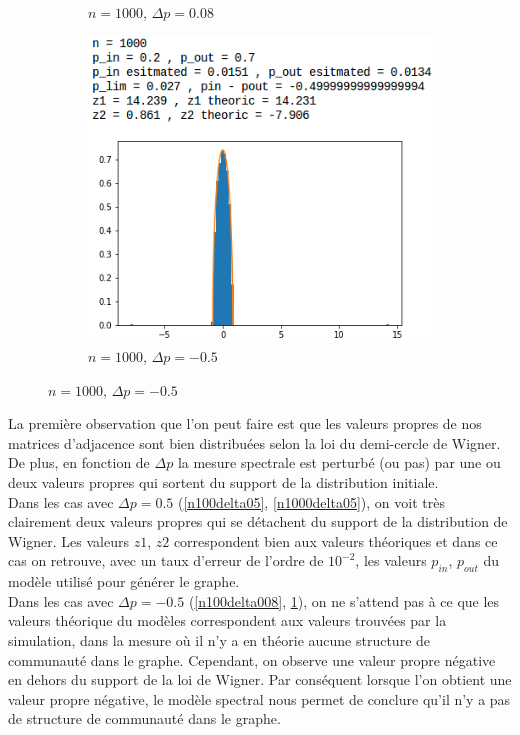 \begin{figure}[H]
\begin{subfigure}{.5\textwidth}
		\caption{$n=1000$, $\Delta p=0.08$}
		\label{n1000delta008}
	\end{subfigure}
	\begin{subfigure}{.5\textwidth}
		\centering
		\includegraphics[scale=0.58]{static/spectral_n1000_pin02_pout07.png}
		\caption{$n=1000$, $\Delta p=-0.5$}
		\label{n1000delta-05}
	\end{subfigure}
\end{figure}

La première observation que l'on peut faire est que les valeurs propres de nos matrices d'adjacence sont bien distribuées selon la loi du demi-cercle de Wigner.
De plus, en fonction de $\Delta p$ la mesure spectrale est perturbé (ou pas) par une ou deux valeurs propres qui sortent du support de la distribution initiale.\\

Dans les cas avec $\Delta p = 0.5$ (\ref{n100delta05}, \ref{n1000delta05}), on voit très clairement deux valeurs propres qui se détachent du support de la distribution de Wigner.
Les valeurs $z1$, $z2$ correspondent bien aux valeurs théoriques et dans ce cas on retrouve, avec un taux d'erreur de l'ordre de $10^{-2}$, les valeurs $p_{in}$, $p_{out}$ du modèle utilisé pour générer le graphe.\\

Dans les cas avec $\Delta p = -0.5$ (\ref{n100delta008}, \ref{n1000delta008}), on ne s'attend pas à ce que les valeurs théorique du modèles correspondent aux valeurs trouvées par la simulation, dans la mesure où il n'y a en théorie aucune structure de communauté dans le graphe.
Cependant, on observe une valeur propre négative en dehors du support de la loi de Wigner.
Par conséquent lorsque l'on obtient une valeur propre négative, le modèle spectral nous permet de conclure qu'il n'y a pas de structure de communauté dans le graphe.\\

